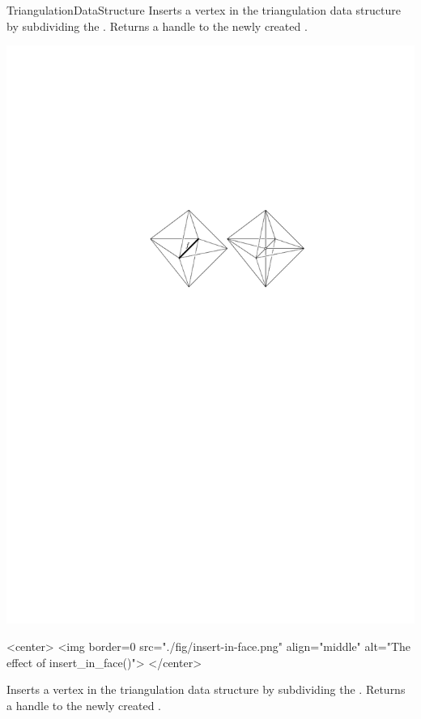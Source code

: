 \begin{ccRefConcept}{TriangulationDataStructure}
{Inserts a vertex in the triangulation data structure by subdividing the
. Returns a handle to the newly created .}
\begin{ccTexOnly}
\begin{center}
\includegraphics{Triangulation_ref/fig/insert-in-face.pdf}
\end{center}
\end{ccTexOnly}
\begin{ccHtmlOnly}
<center>
<img border=0 src="./fig/insert-in-face.png" align="middle" alt="The effect of insert_in_face()">
</center>
\end{ccHtmlOnly}

{Inserts a vertex in the triangulation data structure by subdividing the
. Returns a handle to the newly created .}


\end{ccRefConcept}

